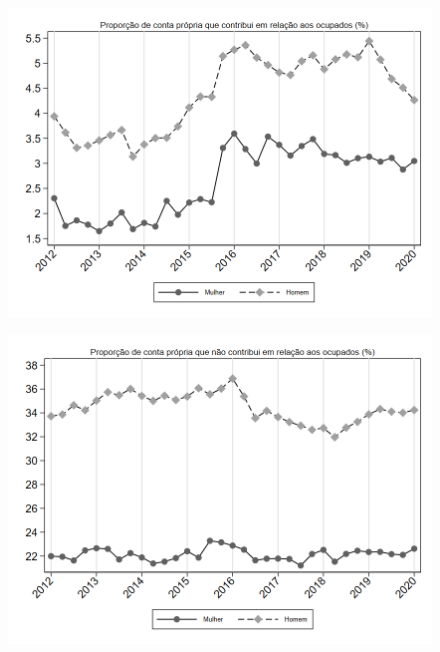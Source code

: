 \begin{frame}[label=_composicao_demografica_genero_prop_cpropriaC]{}
\textit{\hyperlink{_composicao_demografica_genero}{}}
\begin{figure}
  \centering
  \includegraphics[width=1.0\linewidth]{../../analysis/output/composicao_demografica/genero/_composicao_demografica_genero_prop_cpropriaC.png}
  \caption{}
  \label{fig:_composicao_demografica_genero_prop_cpropriaC}
\end{figure}
\end{frame}

\begin{frame}[label=_composicao_demografica_genero_prop_cpropriaNc]{}
\textit{\hyperlink{_composicao_demografica_genero}{}}
\begin{figure}
  \centering
  \includegraphics[width=1.0\linewidth]{../../analysis/output/composicao_demografica/genero/_composicao_demografica_genero_prop_cpropriaNc.png}
  \caption{}
  \label{fig:_composicao_demografica_genero_prop_cpropriaNc}
\end{figure}
\end{frame}